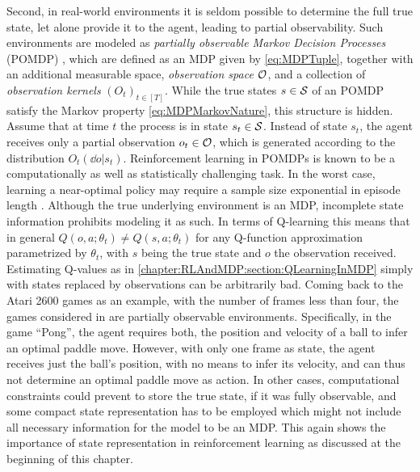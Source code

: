 \documentclass[
    a4paper,
    11pt,
    bibliography=totoc,
    listof=totoc,      
    headinclude=true,
    cleardoublepage=empty,
]{scrbook}
\theoremstyle{plain}
\theoremstyle{definition}
\theoremstyle{remark}
\newcommand{\SpaceS}{{\cal S}}
\newcommand{\SpaceO}{{\cal O}}
\begin{document}
Second, in real-world environments it is seldom possible to determine the full
true state, let alone provide it to the agent, leading to partial 
observability. Such environments are modeled as \textit{partially observable
Markov Decision Processes} (POMDP) \cite{kaelbling1998_paposd}, which are
defined as an MDP given by \eqref{eq:MDPTuple}, together with an additional
measurable space, \textit{observation space}  $\SpaceO$, and a
collection of \textit{observation kernels} $(O_t)_{t\in[T]}$. While the true
states $s\in\SpaceS$ of an POMDP satisfy the Markov property
\eqref{eq:MDPMarkovNature}, this structure is hidden. Assume that at
time $t$ the process is in state $s_t\in\SpaceS$. Instead of state $s_t$, the
agent receives only a partial observation $o_t\in\SpaceO$, which is generated
according to the distribution $O_t(\dd o|s_t)$. Reinforcement learning in
POMDPs is known to be a computationally as well as statistically challenging
task. In the worst case, learning a near-optimal policy may require a sample
size exponential in episode length \cite{krishnamurthy2016_rlwro}.
Although the true underlying environment is an MDP, incomplete state
information prohibits modeling it as such. In terms of Q-learning this means
that in general $Q(o,a;\theta_t)\neq Q(s,a;\theta_t)$
for any Q-function approximation parametrized by $\theta_t$, with $s$ being
the true state and $o$ the observation received. Estimating Q-values as in
\cref{chapter:RLAndMDP:section:QLearningInMDP} simply with states replaced by
observations can be arbitrarily bad. Coming back to the Atari 2600 games as an 
example, with the number of frames 
less than four, the games considered in \cite{mnih2015_hctdrl} are
partially observable environments. Specifically, in the game ``Pong'', the 
agent requires both, the position and velocity of a ball to infer an optimal 
paddle move. However, with only one frame as state, the agent receives just 
the ball's position, with no means to infer its velocity, and can thus not 
determine an optimal paddle move as action. In other cases, computational 
constraints could prevent to store the true state, if it was fully observable, 
and some compact state representation has to be employed which might not 
include all necessary information for the model to be an MDP. This again shows 
the importance of state representation in reinforcement learning as 
discussed at the beginning of this chapter.
\end{document}
